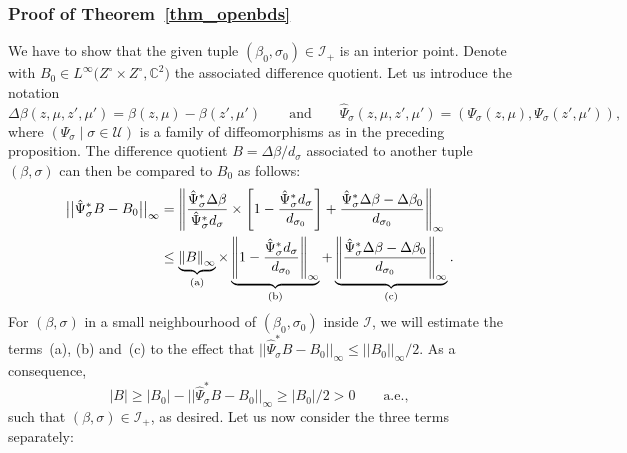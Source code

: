 \documentclass[10pt,a4paper]{amsart}
\numberwithin{equation}{section}
\theoremstyle{definition}
\newcommand{\C}{\mathbb{C}} %
\newcommand{\1}{{\bf 1}}
\begin{document}
\subsubsection*{Proof of Theorem~\ref{thm_openbds}}
We have to show that the given tuple $(\beta_0,\sigma_0)\in \mathcal I_+$ is an interior point. Denote with $B_0\in L^\infty\bigl(Z^\circ\times Z^\circ,\C^2\bigr)$ the associated difference quotient.
 Let us introduce the notation \[
 \Delta \beta(z,\mu,z',\mu')=\beta(z,\mu)-\beta(z',\mu')\qquad \text{and} \qquad \hat \Psi_\sigma(z,\mu,z',\mu')=(\Psi_\sigma(z,\mu),\Psi_\sigma(z',\mu')),\]
 where $(\Psi_\sigma\mid \sigma\in \mathcal U)$ is a family of diffeomorphisms as in the preceding proposition. The difference quotient $B=\Delta \beta/d_{\sigma}$ associated to another tuple $(\beta,\sigma)$ can then be compared to $B_0$ as follows:
\begin{align*}
\big|\big|\hat \Psi_\sigma^*B-B_0\big|\big|_\infty &= \left\Vert
\frac{\hat \Psi_\sigma^*\Delta \beta}{\hat \Psi_\sigma^*d_\sigma} \times \left[1- \frac{\hat \Psi_\sigma^*d_\sigma}{d_{\sigma_0}}\right] + \frac{\hat \Psi_\sigma^*\Delta \beta - \Delta \beta_0}{d_{\sigma_0}}
\right\Vert_\infty \\
&\le
\underbrace{\left
\Vert
B \right\Vert_\infty }_{\rm (a)}\times \underbrace{\left\Vert 1- \frac{\hat \Psi_\sigma^*d_\sigma}{d_{\sigma_0}} \right\Vert_\infty}_{\rm (b)} + \underbrace{ \left\Vert\frac{\hat \Psi_\sigma^*\Delta \beta - \Delta \beta_0}{d_{\sigma_0}} \right\Vert_\infty }_{\rm (c)}.
\end{align*}
For $(\beta,\sigma)$ in a small neighbourhood of $(\beta_0,\sigma_0)$ inside $\mathcal I$, we will estimate the terms~(a), (b) and~(c) to the effect that $\big|\big|\hat \Psi_\sigma^*B-B_0\big|\big|_\infty \le ||B_0||_\infty/2$. As a consequence,
\begin{equation*}
| B | \ge |B_0 | - \big|\big|\hat\Psi_\sigma^*B-B_0\big|\big|_\infty \ge |B_0|/2>0\qquad \text{a.e.},
\end{equation*}
such that $(\beta,\sigma)\in \mathcal I_+$, as desired. Let us now consider the three terms separately:
\end{document}
